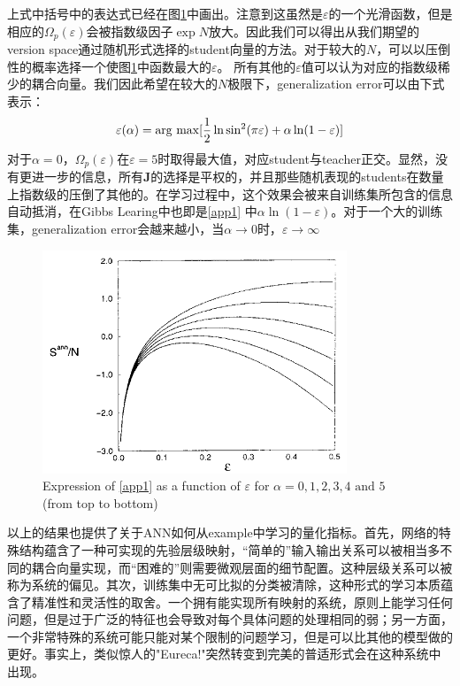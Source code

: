 \documentclass[11pt,fleqn, UTF8]{ctexbook} %
\newcommand{\argmax}{\mathop{\rm arg~max}\limits}
\begin{document}
\begin{subappendices}
上式中括号中的表达式已经在图\ref{fig:app3}中画出。注意到这虽然是$\varepsilon$的一个光滑函数，但是相应的$\Omega_p(\varepsilon)$会被指数级因子$\exp N$放大。因此我们可以得出从我们期望的version space通过随机形式选择的student向量的方法。对于较大的$N$，可以以压倒性的概率选择一个使图\ref{fig:app3}中函数最大的$\varepsilon$。 所有其他的$\varepsilon$值可以认为对应的指数级稀少的耦合向量。我们因此希望在较大的$N$极限下，generalization error可以由下式表示：
\begin{equation*}
  \varepsilon(\alpha)=\argmax[\frac{1}{2}\ln\sin^2(\pi\varepsilon)+\alpha\ln(1-\varepsilon)]
\end{equation*}
对于$\alpha=0$，$\Omega_p(\varepsilon)$在$\varepsilon=5$时取得最大值，对应student与teacher正交。显然，没有更进一步的信息，所有$\boldsymbol{J}$的选择是平权的，并且那些随机表现的students在数量上指数级的压倒了其他的。在学习过程中，这个效果会被来自训练集所包含的信息自动抵消，在Gibbs Learing中也即是\ref{app1} 中$\alpha\ln(1-\varepsilon)$。对于一个大的训练集，generalization error会越来越小，当$\alpha\to0$时，$\varepsilon\to\infty$
\begin{figure}[t]
 \centering
 \includegraphics{pics/app3.png}
 \caption{Expression of \ref{app1} as a function of $\varepsilon$ for $\alpha=0,1,2,3,4\text{ and }5$ (from top to bottom)}
 \label{fig:app3}
\end{figure}

以上的结果也提供了关于ANN如何从example中学习的量化指标。首先，网络的特殊结构蕴含了一种可实现的先验层级映射，“简单的”输入输出关系可以被相当多不同的耦合向量实现，而“困难的”则需要微观层面的细节配置。这种层级关系可以被称为系统的偏见。其次，训练集中无可比拟的分类被清除，这种形式的学习本质蕴含了精准性和灵活性的取舍。一个拥有能实现所有映射的系统，原则上能学习任何问题，但是过于广泛的特征也会导致对每个具体问题的处理相同的弱；另一方面，一个非常特殊的系统可能只能对某个限制的问题学习，但是可以比其他的模型做的更好。事实上，类似惊人的"Eureca!"突然转变到完美的普适形式会在这种系统中出现。


\end{subappendices}
\end{document}
